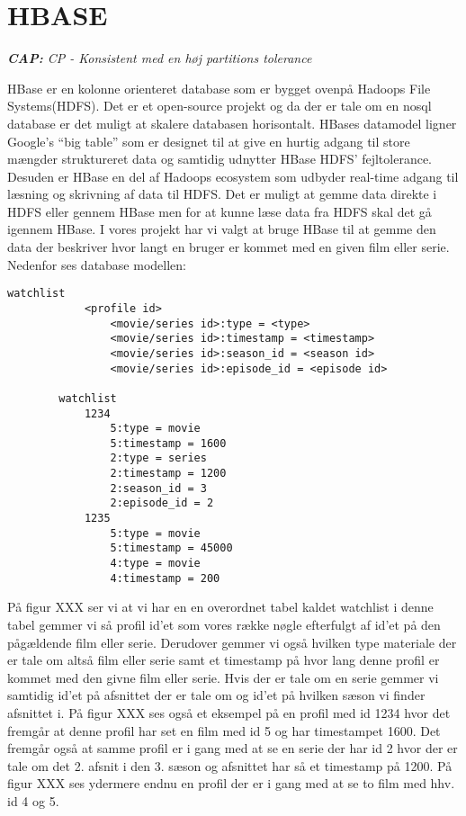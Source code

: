 \section{HBASE}
\begin{displayquote}
    \textit{\textbf{CAP:} CP - Konsistent med en høj partitions tolerance}
\end{displayquote}

HBase er en kolonne orienteret database som er bygget ovenpå Hadoops File Systems(HDFS). Det er et open-source projekt og da der er tale om en nosql database er det muligt at skalere databasen horisontalt. HBases datamodel ligner Google’s “big table” som er designet til at give en hurtig adgang til store mængder struktureret data og samtidig udnytter HBase HDFS’ fejltolerance. Desuden er HBase en del af Hadoops ecosystem som udbyder real-time adgang til læsning og skrivning af data til HDFS. Det er muligt at gemme data direkte i HDFS eller gennem HBase men for at kunne læse data fra HDFS skal det gå igennem HBase. I vores projekt har vi valgt at bruge HBase til at gemme den data der beskriver hvor langt en bruger er kommet med en given film eller serie. Nedenfor ses database modellen:
\begin{tcolorbox}
    \lstset{style=htmlstyle}
    \begin{lstlisting}[language={[Sharp]C}, caption={Watchlist HBASE Model}, label={lst:watchlist}]
        watchlist
            <profile id>
                <movie/series id>:type = <type>
                <movie/series id>:timestamp = <timestamp>
                <movie/series id>:season_id = <season id>
                <movie/series id>:episode_id = <episode id>

        watchlist
            1234
                5:type = movie
                5:timestamp = 1600
                2:type = series
                2:timestamp = 1200
                2:season_id = 3
                2:episode_id = 2
            1235
                5:type = movie
                5:timestamp = 45000
                4:type = movie
                4:timestamp = 200
    \end{lstlisting}
\end{tcolorbox}
På figur XXX ser vi at vi har en en overordnet tabel kaldet watchlist i denne tabel gemmer vi så profil id’et som vores række nøgle efterfulgt af id’et på den pågældende film eller serie. Derudover gemmer vi også hvilken type materiale der er tale om altså film eller serie samt et timestamp på hvor lang denne profil er kommet med den givne film eller serie. Hvis der er tale om en serie gemmer vi samtidig id’et på afsnittet der er tale om og id’et på hvilken sæson vi finder afsnittet i. På figur XXX ses også et eksempel på en profil med id 1234 hvor det fremgår at denne profil har set en film med id 5 og har timestampet 1600. Det fremgår også at samme profil er i gang med at se en serie der har id 2 hvor der er tale om det 2. afsnit i den 3. sæson og afsnittet har så et timestamp på 1200. På figur XXX ses ydermere endnu en profil der er i gang med at se to film med hhv. id 4 og 5.
\bigbreak

